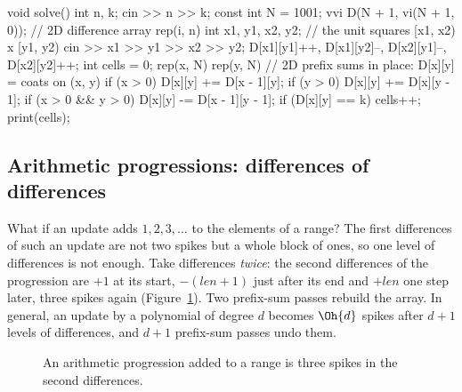 \begin{code}
void solve() {
    int n, k;
    cin >> n >> k;
    const int N = 1001;
    vvi D(N + 1, vi(N + 1, 0));  // 2D difference array
    rep(i, n) {
        int x1, y1, x2, y2;  // the unit squares [x1, x2) x [y1, y2)
        cin >> x1 >> y1 >> x2 >> y2;
        D[x1][y1]++, D[x1][y2]--, D[x2][y1]--, D[x2][y2]++;
    }
    int cells = 0;
    rep(x, N) rep(y, N) {  // 2D prefix sums in place: D[x][y] = coats on (x, y)
        if (x > 0) D[x][y] += D[x - 1][y];
        if (y > 0) D[x][y] += D[x][y - 1];
        if (x > 0 && y > 0) D[x][y] -= D[x - 1][y - 1];
        if (D[x][y] == k) cells++;
    }
    print(cells);
}
\end{code}


\subsection{Arithmetic progressions: differences of differences}

What if an update adds $1, 2, 3, \ldots$ to the elements of a range? The first differences of such an update are not two
spikes but a whole block of ones, so one level of differences is not enough. Take differences \emph{twice}: the second
differences of the progression are $+1$ at its start, $-(len + 1)$ just after its end and $+len$ one step later, three spikes
again (Figure~\ref{fig:diff-ap}). Two prefix-sum passes rebuild the array. In general, an update by a polynomial of degree
$d$ becomes $\Oh{d}$ spikes after $d + 1$ levels of differences, and $d + 1$ prefix-sum passes undo them.

\begin{figure}[htbp]
\centering
{}
\caption{An arithmetic progression added to a range is three spikes in the second differences.}
\label{fig:diff-ap}
\end{figure}

